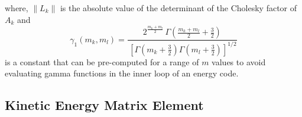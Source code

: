 \documentclass[12pt]{article}
\begin{document}
where, $\left\|  L_{k}\right\|  $ is the absolute value of the determinant of
the Cholesky factor of $A_{k}$ and
\begin{equation}
\gamma_{1}\left(  m_{k},m_{l}\right)  =\frac{2^{\frac{m_{k}+m_{l}}{2}}%
\,\Gamma\left(  \frac{m_{k}+m_{l}}{2}+\frac{3}{2}\right)  }{\,\left[
\Gamma\left(  m_{k}+\frac{3}{2}\right)  \Gamma\left(  m_{l}+\frac{3}%
{2}\right)  \right]  ^{1/2}}%
\end{equation}
is a constant that can be pre-computed for a range of $m$ values to avoid
evaluating gamma functions in the inner loop of an energy code.

\subsection{Kinetic Energy Matrix Element}
\end{document}
